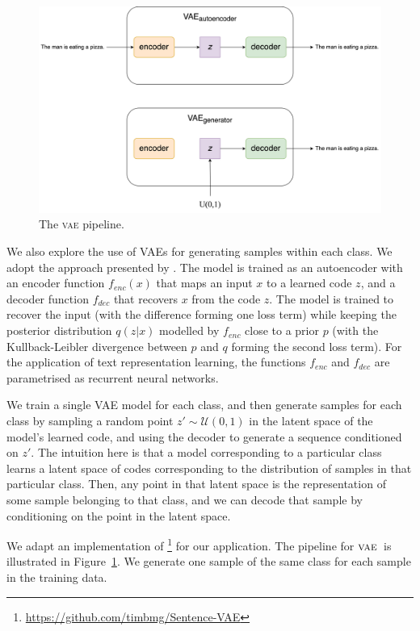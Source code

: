\documentclass[11pt,a4paper]{article}
\newcommand{\vae}{$\textsc{vae}$}
\begin{document}
\begin{figure}
    \centering
    \includegraphics[width=\textwidth]{figs/vae.png}
    \caption{The \textsc{vae} pipeline.}
    \label{fig:vae}
\end{figure}

We also explore the use of VAEs for generating samples within each class. We adopt the approach presented by \citet{bowman-etal-2016-generating}. The model is trained as an autoencoder with an encoder function $f_{enc}(x)$ that maps an input $x$ to a learned code $z$, and a decoder function $f_{dec}$ that recovers $x$ from the code $z$. The model is trained to recover the input (with the difference forming one loss term) while keeping the posterior distribution $q(z|x)$ modelled by $f_{enc}$ close to a prior $p$ (with the Kullback-Leibler divergence between $p$ and $q$ forming the second loss term). For the application of text representation learning, the functions $f_{enc}$ and $f_{dec}$ are parametrised as recurrent neural networks.

We train a single VAE model for each class, and then generate samples for each class by sampling a random point $z' \sim \mathcal{U}(0, 1)$ in the latent space of the model's learned code, and using the decoder to generate a sequence conditioned on $z'$. The intuition here is that a model corresponding to a particular class learns a latent space of codes corresponding to the distribution of samples in that particular class. Then, any point in that latent space is the representation of some sample belonging to that class, and we can decode that sample by conditioning on the point in the latent space.

We adapt an implementation of \citet{bowman-etal-2016-generating}\footnote{\url{https://github.com/timbmg/Sentence-VAE}} for our application. The pipeline for \vae\ is illustrated in Figure~\ref{fig:vae}. We generate one sample of the same class for each sample in the training data.
\end{document}
